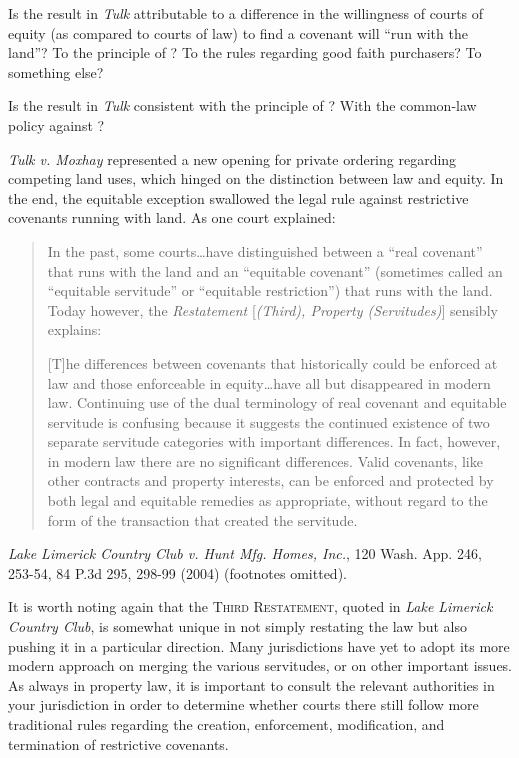
\item Is the result in \textit{Tulk} attributable to a difference in the
willingness of courts of equity (as compared to courts of law) to find a
covenant will ``run with the land''? To the principle of
\textit{}? To
the rules regarding good faith purchasers? To something else?


\item Is the result in \textit{Tulk} consistent with the principle of
\textit{}? With the common-law policy against
?

\item \textit{Tulk v. Moxhay} represented a new opening for private ordering
regarding competing land uses, which hinged on the distinction between law and
equity. In the end, the equitable exception swallowed the legal rule against
restrictive covenants running with land. As one court explained:
\begin{quotation}
In the past, some courts\ldots have distinguished between a ``real covenant''
that runs with the land and an ``equitable covenant'' (sometimes called an
``equitable servitude'' or ``equitable restriction'') that runs with the land.
Today however, the \textit{Restatement} [\textit{(Third), Property
(Servitudes)}] sensibly explains:

[T]he differences between covenants that historically could be enforced at law
and those enforceable in equity\ldots have all but disappeared in modern law.
Continuing use of the dual terminology of real covenant and equitable servitude
is confusing because it suggests the continued existence of two separate
servitude categories with important differences. In fact, however, in modern law
there are no significant differences. Valid covenants, like other contracts and
property interests, can be enforced and protected by both legal and equitable
remedies as appropriate, without regard to the form of the transaction that
created the servitude.
\end{quotation}
\emph{Lake Limerick Country Club v. Hunt Mfg. Homes, Inc.}, 120 Wash. App. 246,
253-54, 84 P.3d 295, 298-99 (2004) (footnotes omitted).

\item It is worth noting again that the \textsc{Third Restatement}, quoted in
\textit{Lake Limerick Country Club}, is somewhat unique in not simply restating
the law but also pushing it in a particular direction. Many jurisdictions have
yet to adopt its more modern approach on merging the various servitudes, or on
other important issues. As always in property law, it is important to consult
the relevant authorities in your jurisdiction in order to determine whether
courts there still follow more traditional rules regarding the creation,
enforcement, modification, and termination of restrictive covenants.

